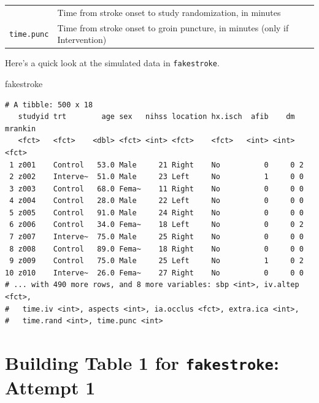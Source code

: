 \documentclass[]{book}
\newenvironment{Shaded}{\begin{snugshade}}{\end{snugshade}}
\newcommand{\NormalTok}[1]{#1}
\theoremstyle{definition}
\theoremstyle{definition}
\theoremstyle{definition}
\theoremstyle{remark}
\begin{document}
\begin{longtable}[]{@{}rl@{}}
\begin{minipage}[t]{0.16\columnwidth}
\end{minipage} & \begin{minipage}[t]{0.55\columnwidth}\raggedright\strut
Time from stroke onset to study randomization, in minutes\strut
\end{minipage}\tabularnewline
\begin{minipage}[t]{0.16\columnwidth}\raggedleft\strut
\texttt{time.punc}\strut
\end{minipage} & \begin{minipage}[t]{0.55\columnwidth}\raggedright\strut
Time from stroke onset to groin puncture, in minutes (only if
Intervention)\strut
\end{minipage}\tabularnewline
\bottomrule
\end{longtable}

Here's a quick look at the simulated data in \texttt{fakestroke}.

\begin{Shaded}
\begin{Highlighting}[]
\NormalTok{fakestroke}
\end{Highlighting}
\end{Shaded}

\begin{verbatim}
# A tibble: 500 x 18
   studyid trt        age sex   nihss location hx.isch  afib    dm mrankin
   <fct>   <fct>    <dbl> <fct> <int> <fct>    <fct>   <int> <int> <fct>  
 1 z001    Control   53.0 Male     21 Right    No          0     0 2      
 2 z002    Interve~  51.0 Male     23 Left     No          1     0 0      
 3 z003    Control   68.0 Fema~    11 Right    No          0     0 0      
 4 z004    Control   28.0 Male     22 Left     No          0     0 0      
 5 z005    Control   91.0 Male     24 Right    No          0     0 0      
 6 z006    Control   34.0 Fema~    18 Left     No          0     0 2      
 7 z007    Interve~  75.0 Male     25 Right    No          0     0 0      
 8 z008    Control   89.0 Fema~    18 Right    No          0     0 0      
 9 z009    Control   75.0 Male     25 Left     No          1     0 2      
10 z010    Interve~  26.0 Fema~    27 Right    No          0     0 0      
# ... with 490 more rows, and 8 more variables: sbp <int>, iv.altep <fct>,
#   time.iv <int>, aspects <int>, ia.occlus <fct>, extra.ica <int>,
#   time.rand <int>, time.punc <int>
\end{verbatim}

\section{\texorpdfstring{Building Table 1 for \texttt{fakestroke}:
Attempt
1}{Building Table 1 for fakestroke: Attempt 1}}\label{building-table-1-for-fakestroke-attempt-1}
\end{document}
